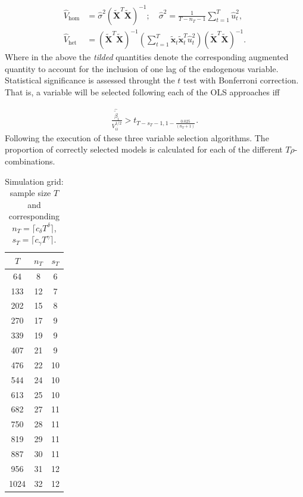 \documentclass[10pt,a4paper,oneside]{article}
\begin{document}
\begin{align*}
    \hat{V}_{\mathrm{hom}} &= \hat{\sigma}^2(\tilde{\boldsymbol{X}}^T \tilde{\boldsymbol{X}})^{-1}; \quad  \hat{\sigma}^2 = \frac{1}{T - n_T - 1}\sum^{T}_{t = 1} \hat{u}_t^2,\\
    \hat{V}_{\mathrm{het}} &= (\tilde{\boldsymbol{X}}^T \tilde{\boldsymbol{X}})^{-1} \left( \sum^T_{t = 1} \tilde{\mathbf{x}}_t \tilde{\mathbf{x}}^T_t \hat{u}^2_t \right) (\tilde{\boldsymbol{X}}^T \tilde{\boldsymbol{X}})^{-1}.
\end{align*}
Where in the above the \textit{tilded} quantities denote the corresponding augmented quantity to account for the inclusion of one lag of the endogenous variable. Statistical significance is assessed throught the $t$ test with Bonferroni correction. That is, a variable will be selected following each of the OLS approaches iff

\begin{align*}
    \frac{\hat{\tilde{\beta}}_i}{V_{ii}^{1 / 2}} > t_{T - s_T - 1, 1 - \frac{0.025}{(n_T + 1)}}.
\end{align*}
Following the execution of these three variable selection algorithms. The proportion of correctly selected models is calculated for each of the different $T \rho$-combinations.


\begin{table}[ht]
\centering
\begin{tabular}{ccc}
\toprule
$T$   & $n_{T}$ & $s_{T}$ \\
\midrule
64    &  8  &  6  \\
133   & 12  &  7  \\
202   & 15  &  8  \\
270   & 17  &  9  \\
339   & 19  &  9  \\
407   & 21  &  9  \\
476   & 22  & 10  \\
544   & 24  & 10  \\
613   & 25  & 10  \\
682   & 27  & 11  \\
750   & 28  & 11  \\
819   & 29  & 11  \\
887   & 30  & 11  \\
956   & 31  & 12  \\
1024  & 32  & 12  \\
\bottomrule
\end{tabular}
\caption{Simulation grid: sample size $T$ and corresponding $n_{T}=\lceil c_{\delta} T^{\delta}\rceil$, $s_{T}=\lceil c_{\gamma}T^{\gamma}\rceil$.}
\label{tab:simulation_grid}
\end{table}
\end{document}
